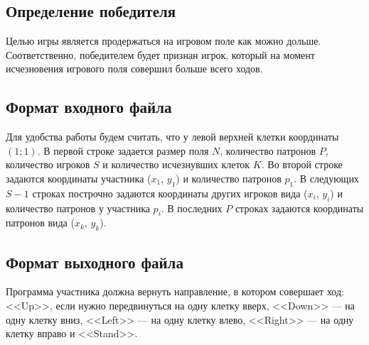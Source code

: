 \documentclass[a4paper,12pt]{article}
\begin{document}
\subsection{Определение победителя}
Целью игры является продержаться на игровом поле как можно дольше. Соответственно, победителем будет признан игрок, который на момент исчезновения игрового поля совершил больше всего ходов.

\subsection{Формат входного файла}
Для удобства работы будем считать, что у левой верхней клетки координаты $(1;1)$.
В первой строке задается размер поля $N$, количество патронов $P$, количество игроков $S$ и количество исчезнувших клеток $K$.
Во второй строке задаются координаты участника ($x_1$, $y_1$) и количество патронов $p_1$.
В следующих $S-1$ строках построчно задаются координаты других игроков вида ($x_i$, $y_i$) и количество патронов у участника $p_i$.
В последних $P$ строках задаются координаты патронов вида ($x_k$, $y_k$).

\subsection{Формат выходного файла}
Программа участника должна вернуть направление, в котором совершает ход: <<Up>>, если нужно передвинуться на одну клетку вверх, <<Down>> — на одну клетку вниз, <<Left>> — на одну клетку влево, <<Right>> — на одну клетку вправо и <<Stand>>.
\end{document}
